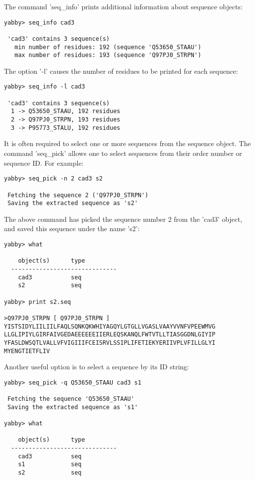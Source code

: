 
The command 'seq\_info' prints additional information about
sequence objects:

\begin{verbatim}
yabby> seq_info cad3

 'cad3' contains 3 sequence(s)
   min number of residues: 192 (sequence 'Q53650_STAAU')
   max number of residues: 193 (sequence 'Q97PJ0_STRPN')
\end{verbatim}

The option '-l' causes the number of residues to be printed
for each sequence: 

\begin{verbatim}
yabby> seq_info -l cad3

 'cad3' contains 3 sequence(s)
  1 -> Q53650_STAAU, 192 residues
  2 -> Q97PJ0_STRPN, 193 residues
  3 -> P95773_STALU, 192 residues
\end{verbatim}

It is often required to select one or more sequences from the sequence
object. The command 'seq\_pick' allows one to select sequences from
their order number or sequence ID. For example:


\begin{verbatim}
yabby> seq_pick -n 2 cad3 s2       

 Fetching the sequence 2 ('Q97PJ0_STRPN')
 Saving the extracted sequence as 's2'
\end{verbatim}

The above command has picked the sequence number 2 from the 'cad3'
object, and saved this sequence under the name 's2': 

\begin{verbatim}
yabby> what

    object(s)      type
  ------------------------------
    cad3           seq           
    s2             seq           

yabby> print s2.seq

>Q97PJ0_STRPN [ Q97PJ0_STRPN ]
YISTSIDYLIILIILFAQLSQNKQKWHIYAGQYLGTGLLVGASLVAAYVVNFVPEEWMVG
LLGLIPIYLGIRFAIVGEDAEEEEEEIIERLEQSKANQLFWTVTLLTIASGGDNLGIYIP
YFASLDWSQTLVALLVFVIGIIIFCEISRVLSSIPLIFETIEKYERIIVPLVFILLGLYI
MYENGTIETFLIV
\end{verbatim}

Another useful option is to select a sequence by its ID string:

\begin{verbatim}
yabby> seq_pick -q Q53650_STAAU cad3 s1

 Fetching the sequence 'Q53650_STAAU'
 Saving the extracted sequence as 's1'

yabby> what

    object(s)      type
  ------------------------------
    cad3           seq           
    s1             seq           
    s2             seq           
\end{verbatim}

